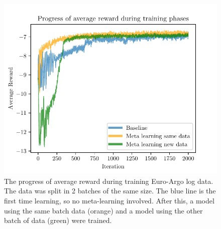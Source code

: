 \begin{figure}[htp!]
    \centering
    \includegraphics[width=.7\textwidth]{./fig/reward.pdf}
    \caption{The progress of average reward during training Euro-Argo log
    data. The data was split in 2 batches of the same size. The blue line is
    the first time learning, so no meta-learning involved. After this, a model
    using the same batch data (orange) and a model using the other batch of
    data (green) were trained.}
    \label{fig:rewards}
\end{figure}
